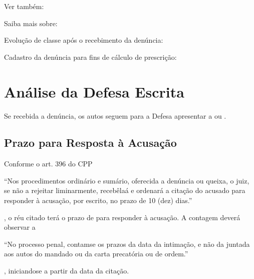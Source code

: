 \documentclass[letterpaper,10pt,brazil]{sphinxmanual}
\begin{document}
\begin{sphinxseealso}{Ver também:}

\sphinxAtStartPar
Saiba mais sobre:

\sphinxAtStartPar
Evolução de classe após o recebimento da denúncia: {\hyperref[\detokenize{projud_19_evolucao_retificacao::doc}]{}}

\sphinxAtStartPar
Cadastro da denúncia para fins de cálculo de prescrição: {\hyperref[\detokenize{projud_53_cadastrodenuncia::doc}]{}}


\end{sphinxseealso}


\sphinxstepscope


\section{Análise da Defesa Escrita}
\label{\detokenize{04analiseDefesa_pautaraij:analise-da-defesa-escrita}}\label{\detokenize{04analiseDefesa_pautaraij:analise-defesa}}\label{\detokenize{04analiseDefesa_pautaraij::doc}}
\sphinxAtStartPar
Se recebida a denúncia, os autos seguem para a Defesa apresentar a  ou .


\subsection{Prazo para Resposta à Acusação}
\label{\detokenize{04analiseDefesa_pautaraij:prazo-para-resposta-a-acusacao}}\label{\detokenize{04analiseDefesa_pautaraij:prazo-resposta}}
\sphinxAtStartPar
Conforme o art. 396 do CPP%
\begin{footnote}[1]\sphinxAtStartFootnote
{} \textendash{} “Nos procedimentos ordinário e sumário, oferecida a denúncia ou queixa, o juiz, se não a rejeitar liminarmente, recebê\sphinxhyphen{}la\sphinxhyphen{}á e ordenará a citação do acusado para responder à acusação, por escrito, no prazo de 10 (dez) dias.”
%
\end{footnote}, o réu citado terá o prazo de  para responder à acusação. A contagem deverá observar a %
\begin{footnote}[2]\sphinxAtStartFootnote
{} \textendash{} “No processo penal, contam\sphinxhyphen{}se os prazos da data da intimação, e não da juntada aos autos do mandado ou da carta precatória ou de ordem.”
%
\end{footnote}, iniciando\sphinxhyphen{}se a partir da data da citação.
\end{document}

